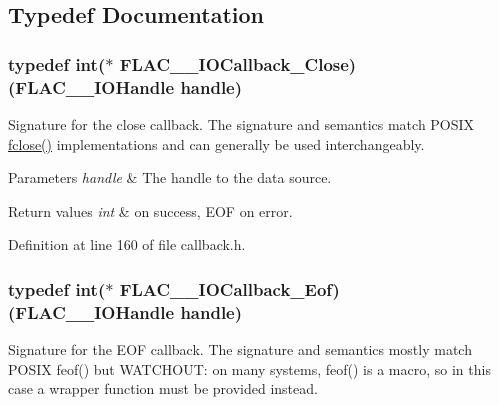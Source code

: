 \subsection{Typedef Documentation}
\subsubsection[{\texorpdfstring{F\+L\+A\+C\+\_\+\+\_\+\+I\+O\+Callback\+\_\+\+Close}{FLAC__IOCallback_Close}}]{\setlength{\rightskip}{0pt plus 5cm}typedef {\bf int}($\ast$ F\+L\+A\+C\+\_\+\+\_\+\+I\+O\+Callback\+\_\+\+Close) ({\bf F\+L\+A\+C\+\_\+\+\_\+\+I\+O\+Handle} handle)}\hypertarget{group__flac__callbacks_ga0032267fac38220689778833e08f7387}{}\label{group__flac__callbacks_ga0032267fac38220689778833e08f7387}
Signature for the close callback. The signature and semantics match P\+O\+S\+IX \hyperlink{conv2dtest_8m_ae93e9d524fd1ef618af3d5070a8126eb}{fclose()} implementations and can generally be used interchangeably.


\begin{DoxyParams}{Parameters}
{\em handle} & The handle to the data source. \\
\hline
\end{DoxyParams}

\begin{DoxyRetVals}{Return values}
{\em int} & {} on success, {\ttfamily E\+OF} on error. \\
\hline
\end{DoxyRetVals}


Definition at line 160 of file callback.\+h.

\subsubsection[{\texorpdfstring{F\+L\+A\+C\+\_\+\+\_\+\+I\+O\+Callback\+\_\+\+Eof}{FLAC__IOCallback_Eof}}]{\setlength{\rightskip}{0pt plus 5cm}typedef {\bf int}($\ast$ F\+L\+A\+C\+\_\+\+\_\+\+I\+O\+Callback\+\_\+\+Eof) ({\bf F\+L\+A\+C\+\_\+\+\_\+\+I\+O\+Handle} handle)}\hypertarget{group__flac__callbacks_ga00ae3b3d373e691908e9539ebf720675}{}\label{group__flac__callbacks_ga00ae3b3d373e691908e9539ebf720675}
Signature for the E\+OF callback. The signature and semantics mostly match P\+O\+S\+IX feof() but W\+A\+T\+C\+H\+O\+UT\+: on many systems, feof() is a macro, so in this case a wrapper function must be provided instead.


